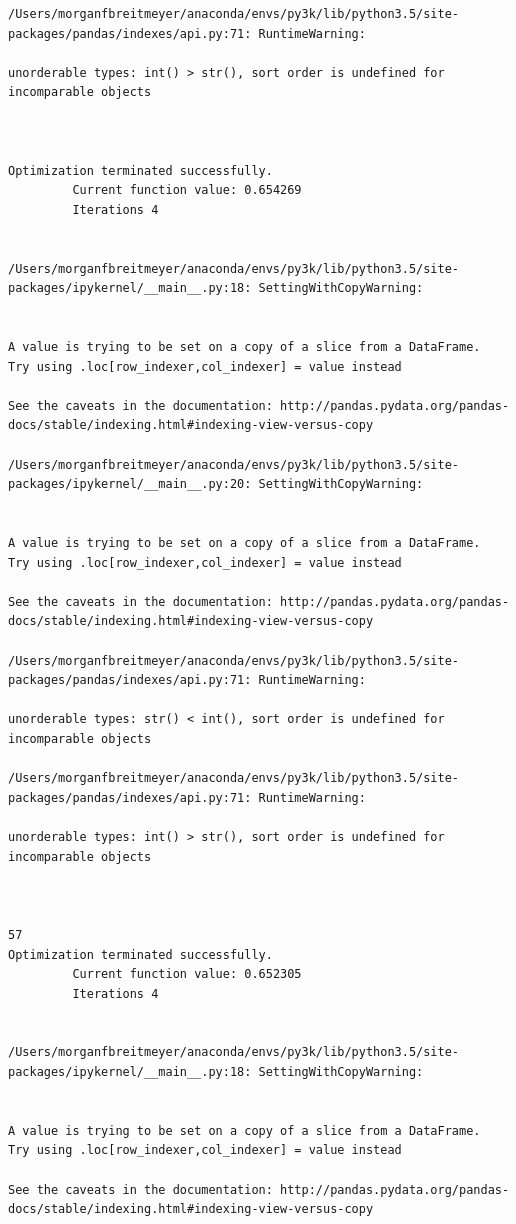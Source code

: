 \begin{lstlisting}
/Users/morganfbreitmeyer/anaconda/envs/py3k/lib/python3.5/site-packages/pandas/indexes/api.py:71: RuntimeWarning:

unorderable types: int() > str(), sort order is undefined for incomparable objects



Optimization terminated successfully.
         Current function value: 0.654269
         Iterations 4


/Users/morganfbreitmeyer/anaconda/envs/py3k/lib/python3.5/site-packages/ipykernel/__main__.py:18: SettingWithCopyWarning:


A value is trying to be set on a copy of a slice from a DataFrame.
Try using .loc[row_indexer,col_indexer] = value instead

See the caveats in the documentation: http://pandas.pydata.org/pandas-docs/stable/indexing.html#indexing-view-versus-copy

/Users/morganfbreitmeyer/anaconda/envs/py3k/lib/python3.5/site-packages/ipykernel/__main__.py:20: SettingWithCopyWarning:


A value is trying to be set on a copy of a slice from a DataFrame.
Try using .loc[row_indexer,col_indexer] = value instead

See the caveats in the documentation: http://pandas.pydata.org/pandas-docs/stable/indexing.html#indexing-view-versus-copy

/Users/morganfbreitmeyer/anaconda/envs/py3k/lib/python3.5/site-packages/pandas/indexes/api.py:71: RuntimeWarning:

unorderable types: str() < int(), sort order is undefined for incomparable objects

/Users/morganfbreitmeyer/anaconda/envs/py3k/lib/python3.5/site-packages/pandas/indexes/api.py:71: RuntimeWarning:

unorderable types: int() > str(), sort order is undefined for incomparable objects



57
Optimization terminated successfully.
         Current function value: 0.652305
         Iterations 4


/Users/morganfbreitmeyer/anaconda/envs/py3k/lib/python3.5/site-packages/ipykernel/__main__.py:18: SettingWithCopyWarning:


A value is trying to be set on a copy of a slice from a DataFrame.
Try using .loc[row_indexer,col_indexer] = value instead

See the caveats in the documentation: http://pandas.pydata.org/pandas-docs/stable/indexing.html#indexing-view-versus-copy


\end{lstlisting}

